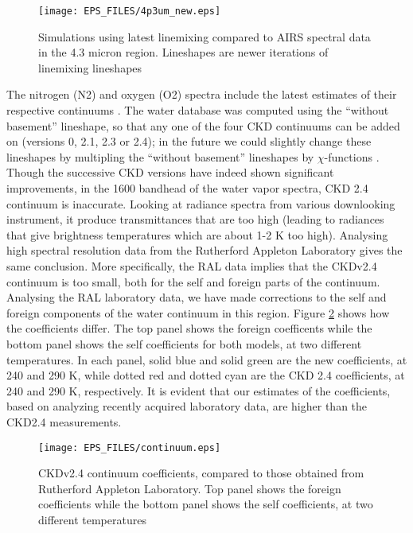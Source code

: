 \documentclass[11pt]{article}
\begin{document}
\begin{figure}
\texttt{[image: EPS\_FILES/4p3um\_new.eps]}
  \caption{Simulations using latest linemixing compared to AIRS spectral data 
           in the 4.3 micron region. Lineshapes are newer iterations of 
           linemixing lineshapes}
  \label{fig:4.3umcompareC} 
\end{figure} 

The nitrogen (N2) and oxygen (O2) spectra include the latest estimates of 
their respective continuums \cite{laf:96,thi:97}.  The water 
database was computed using the  ``without  basement'' lineshape, so that any
one of the four CKD continuums can be added on (versions 0, 2.1, 2.3 or 2.4); 
in the future we could slightly change these lineshapes by multipling the 
``without  basement'' lineshapes by  $\chi$-functions \cite{tob:96*1}. Though
the successive CKD versions have indeed shown significant improvements, in 
the 1600 \wn bandhead of the water vapor spectra, CKD 2.4 continuum is 
inaccurate. Looking at radiance spectra from various downlooking instrument, 
it produce transmittances that are too high (leading to radiances that give 
brightness temperatures which are about 1-2 K too high). Analysing high 
spectral resolution data from the Rutherford Appleton Laboratory gives the same
conclusion. More specifically, the RAL data implies that the CKDv2.4 continuum
is too small, both for the self and foreign parts of the continuum.
Analysing the RAL laboratory data, we have made corrections to the self and
foreign components of the water continuum in this region. 
Figure \ref{fig:continuum} shows how the coefficients differ. The top panel
shows the foreign coefficents while the bottom panel shows the self 
coefficients for both models, at two different temperatures. In each panel,
solid blue and solid green are the new coefficients, at 240 and 290 K, while
dotted red and dotted cyan are the CKD 2.4 coefficients, at 240 and 290 K, 
respectively. It is evident that our estimates of the coefficients, based on 
analyzing recently acquired laboratory data, are higher than the CKD2.4 
measurements. 

\begin{figure}
\texttt{[image: EPS\_FILES/continuum.eps]}
  \caption{CKDv2.4 continuum coefficients, compared to those obtained from 
   Rutherford Appleton Laboratory. Top panel shows the foreign coefficients
   while the bottom panel shows the self coefficients, at two different 
   temperatures}
  \label{fig:continuum} 
\end{figure} 
\end{document}
